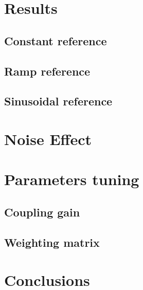 \documentclass{article}
\begin{document}
\section{Results}
\subsection{Constant reference}
\subsection{Ramp reference}
\subsection{Sinusoidal reference}

\section{Noise Effect}
\section{Parameters tuning}
\subsection{Coupling gain}
\subsection{Weighting matrix}

\section{Conclusions}
\end{document}
